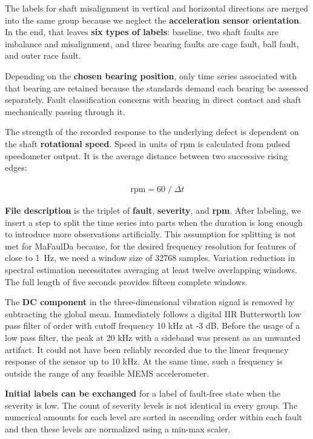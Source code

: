 The labels for shaft misalignment in vertical and horizontal directions are merged into the same group because we neglect the \textbf{acceleration sensor orientation}. In the end, that leaves \textbf{six types of labels}: baseline, two shaft faults are imbalance and misalignment, and three bearing faults are cage fault, ball fault, and outer race fault.  

Depending on the \textbf{chosen bearing position}, only time series associated with that bearing are retained because the standards demand each bearing be assessed separately. Fault classification concerns with bearing in direct contact and shaft mechanically passing through it.

The strength of the recorded response to the underlying defect is dependent on the shaft \textbf{rotational speed}. Speed in units of rpm is calculated from pulsed speedometer output. It is the average distance between two successive rising edges:
\begin{ceqn}\begin{align}
\mathrm{rpm} = 60 \;/\; \overline{\Delta t}
\end{align}\end{ceqn}

\textbf{File description} is the triplet of \textbf{fault}, \textbf{severity}, and \textbf{rpm}. After labeling, we insert a step to split the time series into parts when the duration is long enough to introduce more observations artificially. This assumption for splitting is not met for MaFaulDa because, for the desired frequency resolution for features of close to 1~Hz, we need a window size of 32768 samples. Variation reduction in spectral estimation necessitates averaging at least twelve overlapping windows. The full length of five seconds provides fifteen complete windows.

The \textbf{DC component} in the three-dimensional vibration signal is removed by subtracting the global mean. Immediately follows a digital IIR Butterworth low pass filter of  order with cutoff frequency 10 kHz at -3 dB. Before the usage of a low pass filter, the peak at 20 kHz with a sideband was present as an unwanted artifact. It could not have been reliably recorded due to the linear frequency response of the sensor up to 10 kHz. At the same time, such a frequency is outside the range of any feasible MEMS accelerometer.

\textbf{Initial labels can be exchanged} for a label of fault-free state when the severity is low. The count of severity levels is not identical in every group. The numerical amounts for each level are sorted in ascending order within each fault and then these levels are normalized using a min-max scaler.

